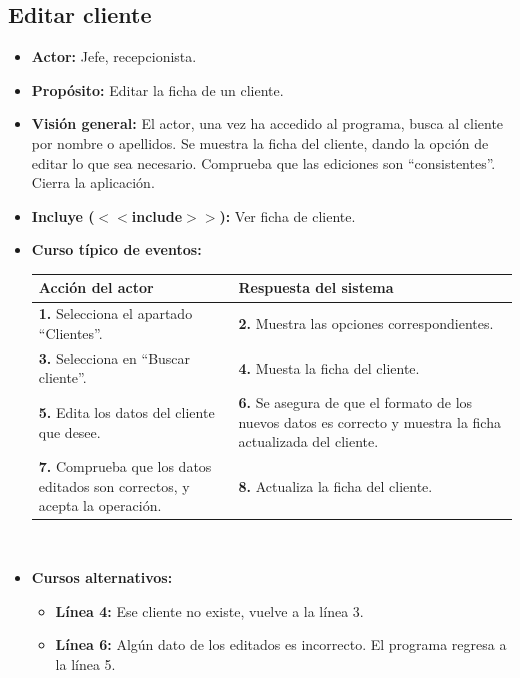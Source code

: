 \documentclass[spanish,a4paper,11pt, twoside]{report}	%
\begin{document}
	\subsection{Editar cliente}		
			\begin{itemize}
			\item \textbf{Actor:} Jefe, recepcionista.
			\item \textbf{Propósito:} Editar la ficha de un cliente.
			\item \textbf{Visión general:} El actor, una vez ha accedido al programa, 
				busca al cliente por nombre o apellidos. Se muestra
				la ficha del cliente, dando la opción de editar lo que sea necesario. Comprueba
				que las ediciones son ``consistentes''. Cierra la aplicación.
			\item \textbf{Incluye ($<<$include$>>$):} Ver ficha de cliente.
			\item \textbf{Curso típico de eventos:} 	\\
				\begin{tabular}{|p{6cm}||p{6cm}|}
				\hline
				\textbf{Acción del actor} & \textbf{Respuesta del sistema} \\ \hline \hline
				\textbf{1.} Selecciona el apartado ``Clientes''. & 
				\textbf{2.} Muestra las opciones correspondientes. \\ \hline
				\textbf{3.} Selecciona en ``Buscar cliente''.	& 
				\textbf{4.} Muesta la ficha del cliente. \\ \hline
				\textbf{5.} Edita los datos del cliente que desee. & 
				\textbf{6.} Se asegura de que el formato de los nuevos datos es correcto y
					muestra la ficha actualizada del cliente.\\ \hline
				\textbf{7.} Comprueba que los datos editados son correctos, y acepta la operación. & 
				\textbf{8.} Actualiza la ficha del cliente. \\ \hline
				\end{tabular}
			\\
			\item \textbf{Cursos alternativos:} 
			\begin{itemize}
				\item  \textbf{Línea 4:} Ese cliente no existe, vuelve a la línea 3.
				\item  \textbf{Línea 6:} Algún dato de los editados es incorrecto. El programa regresa a la línea 5.
			\end {itemize}
		\end{itemize}


\end{document}
